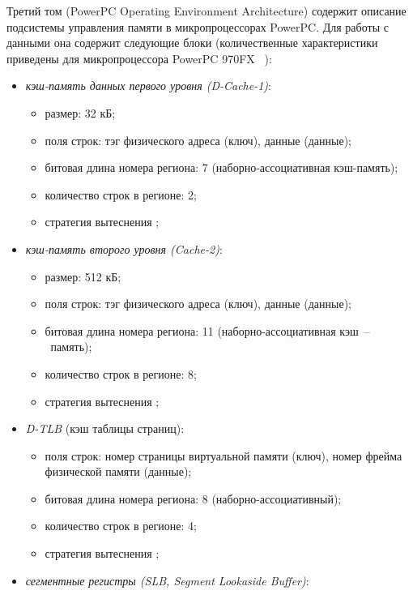 Третий том (PowerPC Operating Environment Architecture) содержит описание подсистемы управления памяти в микропроцессорах PowerPC. Для работы с данными она содержит следующие блоки (количественные характеристики приведены для микропроцессора PowerPC 970FX
~\cite{PowerPC970FXUserManual}):
\begin{itemize}
  \item \emph{кэш-память данных первого уровня (D-Cache-1)}:
        \begin{itemize}
            \item размер: 32 кБ;
            \item поля строк: тэг физического адреса (ключ), данные (данные);
            \item битовая длина номера региона: 7 (наборно-ассоциативная
кэш-память);
            \item количество строк в регионе: 2;
            \item стратегия вытеснения \LRU;
        \end{itemize}
  \item \emph{кэш-память второго уровня (Cache-2)}:
        \begin{itemize}
            \item размер: 512 кБ;
            \item поля строк: тэг физического адреса (ключ), данные (данные);
            \item битовая длина номера региона: 11 (наборно-ассоциативная
кэш~--~память);
            \item количество строк в регионе: 8;
            \item стратегия вытеснения \LRU;
        \end{itemize}
  \item \emph{D-TLB} (кэш таблицы страниц):
        \begin{itemize}
            \item поля строк: номер страницы виртуальной памяти (ключ), номер
фрейма физической памяти (данные);
            \item битовая длина номера региона: 8 (наборно-ассоциативный);
            \item количество строк в регионе: 4;
            \item стратегия вытеснения \LRU;
        \end{itemize}
  \item \emph{сегментные регистры (SLB, Segment Lookaside Buffer)}:
        \begin{itemize}

\end{itemize}
\end{itemize}
